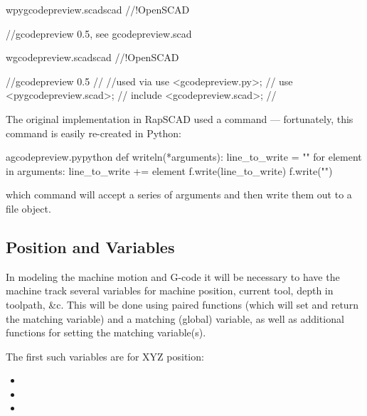 \documentclass{ltxdoc}
\begin{document}
\begin{writecode}{w}{pygcodepreview.scad}{scad}
//!OpenSCAD
 
//gcodepreview 0.5, see gcodepreview.scad

\end{writecode}
\addtocounter{pyscad}{5}

\begin{writecode}{w}{gcodepreview.scad}{scad}
//!OpenSCAD
 
//gcodepreview 0.5
//
//used via use <gcodepreview.py>;
//         use <pygcodepreview.scad>;
//         include <gcodepreview.scad>;
//

\end{writecode}
\addtocounter{gcpscad}{10}

The original implementation in RapSCAD used a command  --- fortunately, 
this command is easily re-created in Python:

\lstset{firstnumber=\thegcpy}
\begin{writecode}{a}{gcodepreview.py}{python}
def writeln(*arguments):
    line_to_write = ""
    for element in arguments:
        line_to_write += element
    f.write(line_to_write)
    f.write("\n")
    
\end{writecode}
\addtocounter{gcpy}{7}

\noindent which command will accept a series of arguments and then write them out to a file 
object.

\subsection{Position and Variables}
 
In modeling the machine motion and G-code it will be necessary to have the machine track 
several variables for machine position, current tool, depth in toolpath, \&c. 
This will be done using paired functions (which will set and return the  
matching variable) and a matching (global) variable, as well as additional functions for 
setting the matching variable(s).

\begin{samepage}
The first such variables are for XYZ position:

\begin{itemize}
 \item {}
 \item {}
 \item {}
\end{itemize}
\end{samepage}
\end{document}
